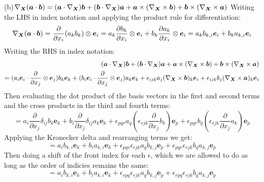 \medskip
(b)$\nabla_{\bm{X}} (\bm{a} \cdot \bm{b}) = (\bm{a} \cdot \nabla_{\bm{X}}) \bm{b} + (\bm{b} \cdot \nabla_{\bm{X}}) \bm{a} + \bm{a} \times (\nabla_{\bm{X}} \times \bm{b}) + \bm{b} \times (\nabla_{\bm{X}} \times \bm{a})$ \newline
Writing the LHS in index notation and applying the product rule for differentiation:
\begin{equation}
    \nabla_{\bm{X}} (\bm{a} \cdot \bm{b}) = \frac{\partial}{\partial x_i}(a_kb_k) \otimes \bm{e}_i = a_k \frac{\partial b_k}{\partial x_i} \otimes \bm{e}_i + b_k \frac{\partial a_k}{\partial x_i} \otimes \bm{e}_i = a_k b_{k,i} \bm{e}_i + b_k a_{k,i} \bm{e}_i
\end{equation}
Writing the RHS in index notation:
\begin{equation}
    \begin{split}
    (\bm{a} \cdot \nabla_{\bm{X}}) \bm{b} + (\bm{b} \cdot \nabla_{\bm{X}}) \bm{a} + \bm{a} \times (\nabla_{\bm{X}} \times \bm{b}) + \bm{b} \times (\nabla_{\bm{X}} \times \bm{a}) \\
    = (a_i\bm{e}_i \cdot \frac{\partial}{\partial x_j} \otimes \bm{e}_j)b_k\bm{e}_k + (b_i\bm{e}_i \cdot \frac{\partial}{\partial x_j} \otimes \bm{e}_j)a_k\bm{e}_k + \epsilon_{ijk}a_j(\nabla_{\bm{X}} \times \bm{b})_k\bm{e}_i + \epsilon_{ijk}b_j(\nabla_{\bm{X}} \times \bm{a})_k\bm{e}_i
    \end{split}
\end{equation}
Then evaluating the dot product of the basis vectors in the first and second terms and the cross products in the third and fourth terms:
\begin{equation}
    = a_i \frac{\partial}{\partial x_j}\delta_{ij}b_k\bm{e}_k + b_i\frac{\partial}{\partial x_j}\delta_{ij}a_k\bm{e}_k + \epsilon_{pqr}a_q(\epsilon_{rjk}\frac{\partial}{\partial x_j}b_k)\bm{e}_p + \epsilon_{pqr}b_q(\epsilon_{rjk}\frac{\partial}{\partial x_j}a_k)\bm{e}_p
\end{equation}
Applying the Kronecker delta and rearranging terms we get:
\begin{equation}
    = a_i b_{k,i}\bm{e}_k + b_ia_{k,i}\bm{e}_k + \epsilon_{pqr}\epsilon_{rjk}a_qb_{k,j}\bm{e}_p + \epsilon_{pqr}\epsilon_{rjk}b_qa_{k,j}\bm{e}_p
\end{equation}
Then doing a shift of the front index for each $\epsilon$, which we are allowed to do as long as the order of indicies remains the same:
\begin{equation}
    = a_i b_{k,i}\bm{e}_k + b_ia_{k,i}\bm{e}_k + \epsilon_{rpq}\epsilon_{rjk}a_qb_{k,j}\bm{e}_p + \epsilon_{rpq}\epsilon_{rjk}b_qa_{k,j}\bm{e}_p
\end{equation}

